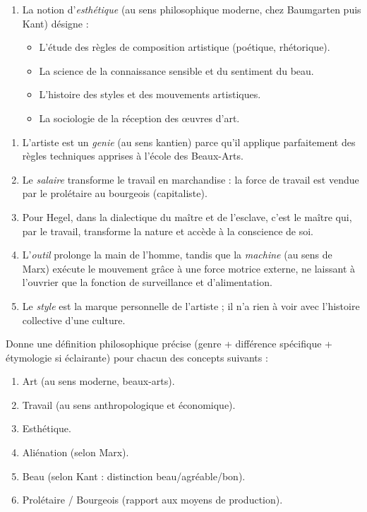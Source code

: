 \documentclass[11pt]{article}
\newcommand{\cle}[1]{{\popxbold\color{popdark}#1}}
\begin{document}
\begin{exercice}
\begin{enumerate}
\item La notion d'\emph{esthétique} (au sens philosophique moderne, chez Baumgarten puis Kant) désigne :
\begin{itemize}
\item[A.] L'étude des règles de composition artistique (poétique, rhétorique).
\item[B.] La science de la connaissance sensible et du sentiment du beau.
\item[C.] L'histoire des styles et des mouvements artistiques.
\item[D.] La sociologie de la réception des œuvres d'art.
\end{itemize}
\end{enumerate}
\end{exercice}

\begin{exercice}
\begin{enumerate}
\item L'artiste est un \emph{genie} (au sens kantien) parce qu'il applique parfaitement des règles techniques apprises à l'école des Beaux-Arts.
\item Le \emph{salaire} transforme le travail en marchandise : la force de travail est vendue par le prolétaire au bourgeois (capitaliste).
\item Pour Hegel, dans la dialectique du maître et de l'esclave, c'est le maître qui, par le travail, transforme la nature et accède à la conscience de soi.
\item L'\emph{outil} prolonge la main de l'homme, tandis que la \emph{machine} (au sens de Marx) exécute le mouvement grâce à une force motrice externe, ne laissant à l'ouvrier que la fonction de surveillance et d'alimentation.
\item Le \emph{style} est la marque personnelle de l'artiste ; il n'a rien à voir avec l'histoire collective d'une culture.
\end{enumerate}
\end{exercice}

\begin{exercice}
Donne une définition philosophique précise (genre + différence spécifique + étymologie si éclairante) pour chacun des concepts suivants :
\begin{enumerate}
\item \cle{Art} (au sens moderne, beaux-arts).
\item \cle{Travail} (au sens anthropologique et économique).
\item \cle{Esthétique}.
\item \cle{Aliénation} (selon Marx).
\item \cle{Beau} (selon Kant : distinction beau/agréable/bon).
\item \cle{Prolétaire} / \cle{Bourgeois} (rapport aux moyens de production).
\end{enumerate}
\end{exercice}
\end{document}
